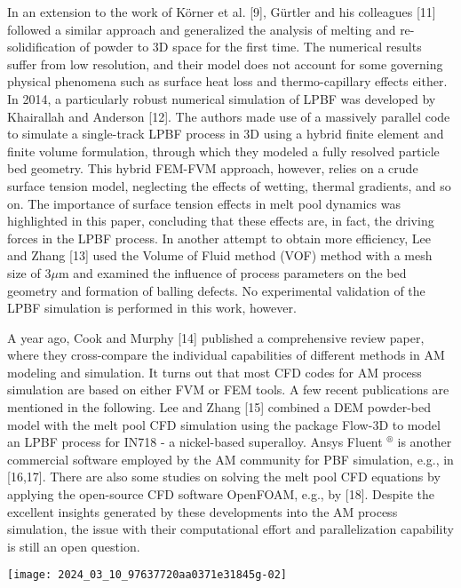 \documentclass[10pt]{article}
\begin{document}
In an extension to the work of Körner et al. [9], Gürtler and his colleagues [11] followed a similar approach and generalized the analysis of melting and re-solidification of powder to 3D space for the first time. The numerical results suffer from low resolution, and their model does not account for some governing physical phenomena such as surface heat loss and thermo-capillary effects either. In 2014, a particularly robust numerical simulation of LPBF was developed by Khairallah and Anderson [12]. The authors made use of a massively parallel code to simulate a single-track LPBF process in 3D using a hybrid finite element and finite volume formulation, through which they modeled a fully resolved particle bed geometry. This hybrid FEM-FVM approach, however, relies on a crude surface tension model, neglecting the effects of wetting, thermal gradients, and so on. The importance of surface tension effects in melt pool dynamics was highlighted in this paper, concluding that these effects are, in fact, the driving forces in the LPBF process. In another attempt to obtain more efficiency, Lee and Zhang [13] used the Volume of Fluid method (VOF) method with a mesh size of $3 \mu \mathrm{m}$ and examined the influence of process parameters on the bed geometry and formation of balling defects. No experimental validation of the LPBF simulation is performed in this work, however.

A year ago, Cook and Murphy [14] published a comprehensive review paper, where they cross-compare the individual capabilities of different methods in AM modeling and simulation. It turns out that most CFD codes for AM process simulation are based on either FVM or FEM tools. A few recent publications are mentioned in the following. Lee and Zhang [15] combined a DEM powder-bed model with the melt pool CFD simulation using the package Flow-3D to model an LPBF process for IN718 - a nickel-based superalloy. Ansys Fluent ${ }^{\circledR}$ is another commercial software employed by the AM community for PBF simulation, e.g., in [16,17]. There are also some studies on solving the melt pool CFD equations by applying the open-source CFD software OpenFOAM, e.g., by [18]. Despite the excellent insights generated by these developments into the AM process simulation, the issue with their computational effort and parallelization capability is still an open question.

\begin{center}
\texttt{[image: 2024\_03\_10\_97637720aa0371e31845g-02]}
\end{center}
\end{document}
